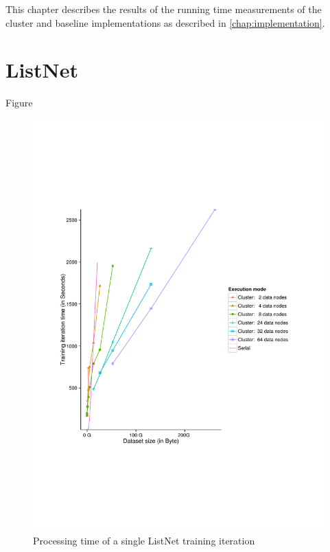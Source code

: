 This chapter describes the results of the running time measurements of the cluster and baseline implementations as described in \ref{chap:implementation}.
\section{ListNet}
Figure
\begin{figure}
\centering
\includegraphics[trim=0cm 5cm 0cm 5cm, scale=0.7]{gfx/time_single.pdf}
\caption{Processing time of a single ListNet training iteration}
\label{fig:listnet_train_time}
\end{figure}

